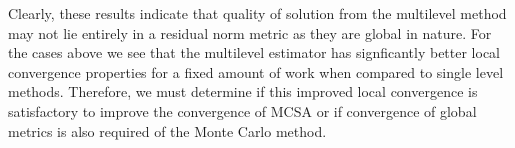 \documentclass[note]{TechNote}
\begin{document}
Clearly, these results indicate that quality of solution from the
multilevel method may not lie entirely in a residual norm metric as
they are global in nature. For the cases above we see that the
multilevel estimator has signficantly better local convergence
properties for a fixed amount of work when compared to single level
methods. Therefore, we must determine if this improved local
convergence is satisfactory to improve the convergence of MCSA or if
convergence of global metrics is also required of the Monte Carlo method.

\clearpage




\closing
\caution
\end{document}
